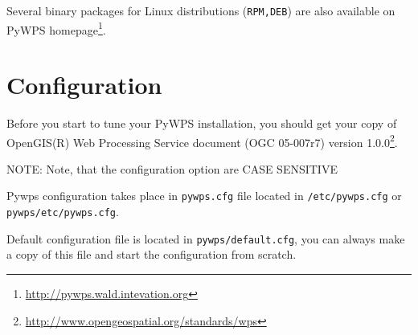 \documentclass[a4paper,11pt]{article}
\newcommand{\pywpssite}{\url{http://pywps.wald.intevation.org}}
\newcommand{\note}[1]{\medskip{}\noindent{}NOTE: #1\medskip{}}
\begin{document}
Several binary packages for Linux distributions (\texttt{RPM,DEB}) are also available on PyWPS
homepage\footnote{\pywpssite}.

\section{Configuration}
\label{configuration}
    
Before you start to tune your PyWPS installation, you should get your copy of
OpenGIS(R) Web Processing Service document (OGC  05-007r7) version
1.0.0\footnote{\url{http://www.opengeospatial.org/standards/wps}}.
    
\note{Note, that the configuration option are CASE SENSITIVE}
    
Pywps configuration takes place in \texttt{pywps.cfg} file located in
\texttt{/etc/pywps.cfg} or \texttt{pywps/etc/pywps.cfg}. 

Default configuration file is located in \texttt{pywps/default.cfg}, you
can always make a copy of this file and start the configuration from
scratch.
    
\end{document}
